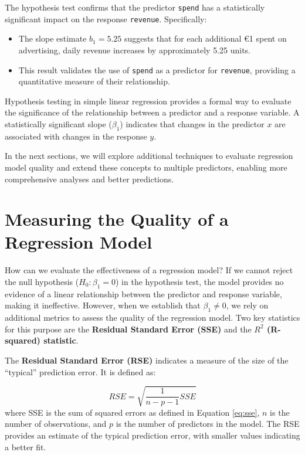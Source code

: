 \documentclass[
]{book}
\newcommand{\passthrough}[1]{#1}
\providecommand{\tightlist}{%
  \setlength{\itemsep}{0pt}\setlength{\parskip}{0pt}}
\theoremstyle{definition}
\theoremstyle{definition}
\theoremstyle{definition}
\theoremstyle{definition}
\theoremstyle{remark}
\begin{document}
The hypothesis test confirms that the predictor \passthrough{\lstinline!spend!} has a statistically significant impact on the response \passthrough{\lstinline!revenue!}. Specifically:

\begin{itemize}
\tightlist
\item
  The slope estimate \(b_1 = 5.25\) suggests that for each additional €1 spent on advertising, daily revenue increases by approximately 5.25 units.\\
\item
  This result validates the use of \passthrough{\lstinline!spend!} as a predictor for \passthrough{\lstinline!revenue!}, providing a quantitative measure of their relationship.
\end{itemize}

Hypothesis testing in simple linear regression provides a formal way to evaluate the significance of the relationship between a predictor and a response variable. A statistically significant slope (\(\beta_1\)) indicates that changes in the predictor \(x\) are associated with changes in the response \(y\).

In the next sections, we will explore additional techniques to evaluate regression model quality and extend these concepts to multiple predictors, enabling more comprehensive analyses and better predictions.

\section{Measuring the Quality of a Regression Model}\label{measuring-the-quality-of-a-regression-model}

How can we evaluate the effectiveness of a regression model? If we cannot reject the null hypothesis (\(H_0: \beta_1 = 0\)) in the hypothesis test, the model provides no evidence of a linear relationship between the predictor and response variable, making it ineffective. However, when we establish that \(\beta_1 \neq 0\), we rely on additional metrics to assess the quality of the regression model. Two key statistics for this purpose are the \textbf{Residual Standard Error (SSE)} and the \textbf{\(R^2\) (R-squared) statistic}.

The \textbf{Residual Standard Error (RSE)} indicates a measure of the size of the ``typical'' prediction error. It is defined as:

\[
RSE = \sqrt{\frac{1}{n-p-1} SSE}
\]
where SSE is the sum of squared errors as defined in Equation \eqref{eq:sse}, \(n\) is the number of observations, and \(p\) is the number of predictors in the model. The RSE provides an estimate of the typical prediction error, with smaller values indicating a better fit.
\end{document}
